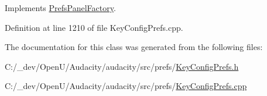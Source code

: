 Implements \hyperlink{class_prefs_panel_factory_a4814184d6050665a43f4929caa73aa0c}{Prefs\+Panel\+Factory}.



Definition at line 1210 of file Key\+Config\+Prefs.\+cpp.



The documentation for this class was generated from the following files\+:\begin{DoxyCompactItemize}
\item 
C\+:/\+\_\+dev/\+Open\+U/\+Audacity/audacity/src/prefs/\hyperlink{_key_config_prefs_8h}{Key\+Config\+Prefs.\+h}\item 
C\+:/\+\_\+dev/\+Open\+U/\+Audacity/audacity/src/prefs/\hyperlink{_key_config_prefs_8cpp}{Key\+Config\+Prefs.\+cpp}\end{DoxyCompactItemize}
